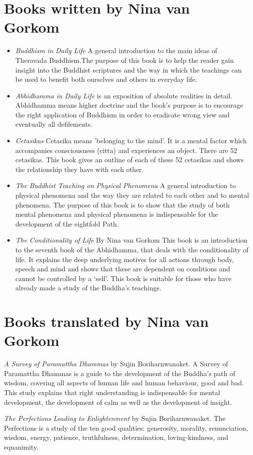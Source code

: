 ﻿\section{Books written by Nina van Gorkom}

\begin{itemize}
\item
\emph{Buddhism in Daily Life} A general introduction to the main ideas
of Theravada Buddhism.The purpose of this book is to help the reader
gain insight into the Buddhist scriptures and the way in which the
teachings can be used to benefit both ourselves and others in everyday
life.
\item
\emph{Abhidhamma in Daily Life} is an exposition of absolute realities
in detail. Abhidhamma means higher doctrine and the book's purpose
is to encourage the right application of Buddhism in order to eradicate
wrong view and eventually all defilements.

\item
\emph{Cetasikas} Cetasika means 'belonging to the mind'. It is a mental
factor which accompanies consciousness (citta) and experiences an
object. There are 52 cetasikas. This book gives an outline of each
of these 52 cetasikas and shows the relationship they have with each
other.
\item
\emph{The Buddhist Teaching on Physical Phenomena} A general introduction
to physical phenomena and the way they are related to each other and
to mental phenomena. The purpose of this book is to show that the
study of both mental phenomena and physical phenomena is indispensable
for the development of the eightfold Path.

\item
\emph{The Conditionality of Life} By Nina van Gorkom
This book is an introduction to the seventh book of the Abhidhamma,
that deals with the conditionality of life. It explains the deep underlying
motives for all actions through body, speech and mind and shows that these are
dependent on conditions and cannot be controlled by a ‘self’. This book is suitable for those who have already made a study of
the Buddha’s teachings.
\end {itemize}

\section{Books translated by Nina van Gorkom}

\item
\emph{A Survey of Paramattha Dhammas} by Sujin Boriharnwanaket. A Survey of Paramattha Dhammas is a guide to the development of the Buddha's path of wisdom, covering all aspects of human life and human behaviour, good and bad. This study explains that right understanding is indispensable for mental
development, the development of calm as well as the development of
insight.
\item
\emph{The Perfections Leading to Enlightenment} by Sujin Boriharnwanaket. The Perfections is a study of the ten good qualities: generosity, morality, renunciation,
wisdom, energy, patience, truthfulness, determination, loving-kindness,
and equanimity.


